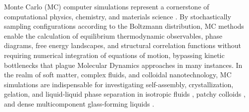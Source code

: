 \documentclass[final,5p,times,twocolumn]{elsarticle}
\begin{document}
Monte Carlo (MC) computer simulations represent a cornerstone of
computational physics, chemistry, and materials science
\cite{frenkel2001understanding,allen2017computer}. By stochastically
sampling configurations according to the Boltzmann distribution, MC
methods enable the calculation of equilibrium thermodynamic
observables, phase diagrams, free energy landscapes, and structural
correlation functions without requiring numerical integration of
equations of motion, bypassing kinetic bottlenecks that plague
Molecular Dynamics approaches in many instances. In the realm of soft
matter, complex fluids, and 
colloidal nanotechnology, MC simulations are indispensable for
investigating self-assembly, crystallization, gelation, and
liquid-liquid phase separation in isotropic fluids
\cite{carnahan1969equation}, patchy colloids
\cite{bianchi2006phase,sciortino2007patchy,Noya21,palaia2022patchy},
and dense multicomponent glass-forming liquids
\cite{ninarello2017models,berthier2017configurational}. 
\end{document}
